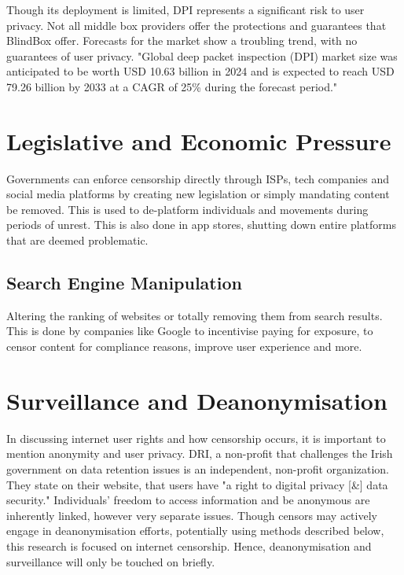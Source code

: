 Though its deployment is limited, DPI represents a significant risk to user privacy. Not all middle box providers offer the protections and guarantees that BlindBox offer. Forecasts for the market show a troubling trend, with no guarantees of user privacy. "Global deep packet inspection (DPI) market size was anticipated to be worth USD 10.63 billion in 2024 and is expected to reach USD 79.26 billion by 2033 at a CAGR of 25\% during the forecast period." \cite{DPIMarketInfo}

\section{Legislative and Economic Pressure}
Governments can enforce censorship directly through ISPs, tech companies and social media platforms by creating new legislation or simply mandating content be removed. This is used to de-platform individuals and movements during periods of unrest. This is also done in app stores, shutting down entire platforms that are deemed problematic.

\subsection{Search Engine Manipulation}

Altering the ranking of websites or totally removing them from search results. This is done by companies like Google to incentivise paying for exposure, to censor content for compliance reasons, improve user experience and more. 


\section{Surveillance and Deanonymisation}

In discussing internet user rights and how censorship occurs, it is important to mention anonymity and user privacy. DRI, a non-profit that challenges the Irish government on data retention issues is an independent, non-profit organization. They state on their website, that users have "a right to digital privacy [\&] data security." \cite{digital_rights_ireland} Individuals' freedom to access information and be anonymous are inherently linked, however very separate issues. Though censors may actively engage in deanonymisation efforts, potentially using methods described below, this research is focused on internet censorship. Hence, deanonymisation and surveillance will only be touched on briefly.


